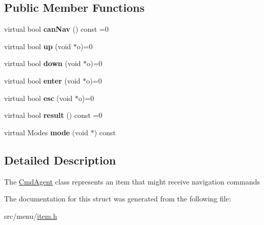 \subsection*{Public Member Functions}
\begin{DoxyCompactItemize}
\item 
\mbox{\label{structCmdAgent_a1a0eedb14708cc96c254922c545915c5}} 
virtual bool {\bfseries can\+Nav} () const =0
\item 
\mbox{\label{structCmdAgent_a310f823c00f4a7dc427a1d31f6158897}} 
virtual bool {\bfseries up} (void $\ast$o)=0
\item 
\mbox{\label{structCmdAgent_ae95a8096248043644ac58cba80a378b2}} 
virtual bool {\bfseries down} (void $\ast$o)=0
\item 
\mbox{\label{structCmdAgent_a673709ce059dbd54d86c61b0fdc9a17a}} 
virtual bool {\bfseries enter} (void $\ast$o)=0
\item 
\mbox{\label{structCmdAgent_a5fb6b466ecb88ebad13a1e1a1099ef21}} 
virtual bool {\bfseries esc} (void $\ast$o)=0
\item 
\mbox{\label{structCmdAgent_a4836801b65eaf6df12a72ccb8fe0834d}} 
virtual bool {\bfseries result} () const =0
\item 
\mbox{\label{structCmdAgent_ada5721aa515247e2b4b33e8185fdaf6e}} 
virtual Modes {\bfseries mode} (void $\ast$) const
\end{DoxyCompactItemize}


\subsection{Detailed Description}
The \hyperlink{structCmdAgent}{Cmd\+Agent} class represents an item that might receive navigation commands 

The documentation for this struct was generated from the following file\+:\begin{DoxyCompactItemize}
\item 
src/menu/\hyperlink{item_8h}{item.\+h}\end{DoxyCompactItemize}

